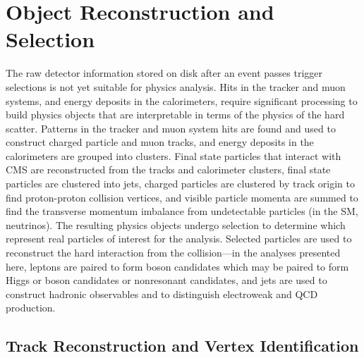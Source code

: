 
\chapter{Object Reconstruction and Selection}\label{ch:reco}

The raw detector information stored on disk after an event passes trigger selections is not yet suitable for physics analysis.
Hits in the tracker and muon systems, and energy deposits in the calorimeters, require significant processing to build physics objects that are interpretable in terms of the physics of the hard scatter.
Patterns in the tracker and muon system hits are found and used to construct charged particle and muon tracks, and energy deposits in the calorimeters are grouped into clusters.
Final state particles that interact with CMS are reconstructed from the tracks and calorimeter clusters, final state particles are clustered into jets, charged particles are clustered by track origin to find proton-proton collision vertices, and visible particle momenta are summed to find the transverse momentum imbalance from undetectable particles (in the SM, neutrinos).
The resulting physics objects undergo selection to determine which represent real particles of interest for the analysis.
Selected particles are used to reconstruct the hard interaction from the collision---in the analyses presented here, leptons are paired to form {\Zgs} boson candidates which may be paired to form Higgs or {\PZ} boson candidates or nonresonant {\ZZ} candidates, and jets are used to construct hadronic observables and to distinguish electroweak and QCD {\ZZ} production.


\section{Track Reconstruction and Vertex Identification}\label{sec:trkVtxReco}

